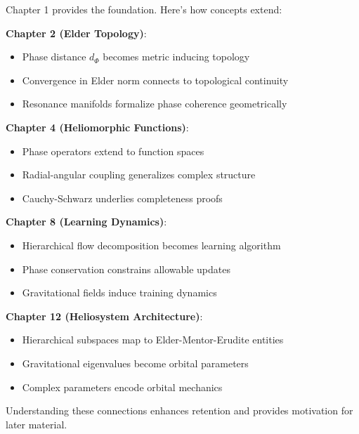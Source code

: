 \begin{note}
Chapter 1 provides the foundation. Here's how concepts extend:

\textbf{Chapter 2 (Elder Topology)}:
\begin{itemize}
\item Phase distance $d_{\Phi}$ becomes metric inducing topology
\item Convergence in Elder norm connects to topological continuity
\item Resonance manifolds formalize phase coherence geometrically
\end{itemize}

\textbf{Chapter 4 (Heliomorphic Functions)}:
\begin{itemize}
\item Phase operators extend to function spaces
\item Radial-angular coupling generalizes complex structure
\item Cauchy-Schwarz underlies completeness proofs
\end{itemize}

\textbf{Chapter 8 (Learning Dynamics)}:
\begin{itemize}
\item Hierarchical flow decomposition becomes learning algorithm
\item Phase conservation constrains allowable updates
\item Gravitational fields induce training dynamics
\end{itemize}

\textbf{Chapter 12 (Heliosystem Architecture)}:
\begin{itemize}
\item Hierarchical subspaces map to Elder-Mentor-Erudite entities
\item Gravitational eigenvalues become orbital parameters
\item Complex parameters encode orbital mechanics
\end{itemize}

Understanding these connections enhances retention and provides motivation for later material.
\end{note}

